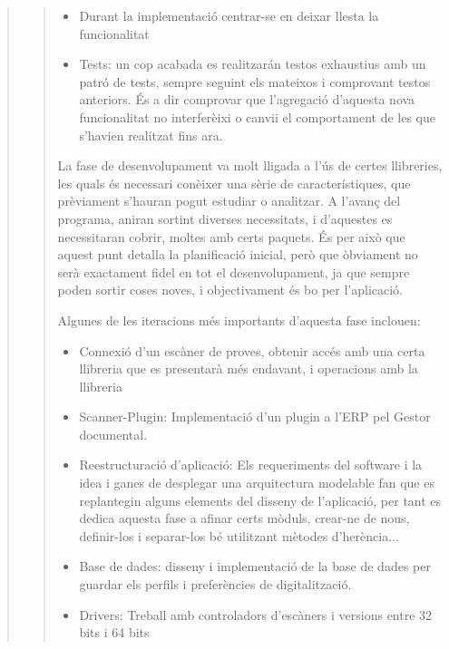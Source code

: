 \documentclass[letterpaper,11pt,catalan]{sphinxmanual}
\begin{document}
\begin{quote}
\begin{quote}
\begin{itemize}
\begin{itemize}
\end{itemize}

\item {} 
Durant la implementació centrar-se en deixar llesta la funcionalitat

\item {} 
Tests: un cop \sphinxquotedblleft{}acabada\sphinxquotedblright{} es realitzarán testos exhaustius amb un patró
de tests, sempre seguint els mateixos i comprovant testos anteriors. És a dir
comprovar que l'agregació d'aquesta nova funcionalitat no interferèixi o canvii
el comportament de les que s'havien realitzat fins ara.

\end{itemize}

La fase de desenvolupament va molt lligada a l'ús de certes llibreries, les quals
és necessari conèixer una sèrie de característiques, que prèviament s'hauran pogut
estudiar o analitzar. A l'avanç del programa, aniran sortint diverses necessitats, i
d'aquestes es necessitaran cobrir, moltes amb certs paquets. És per això que aquest
punt detalla la planificació inicial, però que òbviament no serà exactament fidel
en tot el desenvolupament, ja que sempre poden sortir coses noves, i objectivament
és bo per l'aplicació.

Algunes de les iteracions més importants d'aquesta fase inclouen:
\begin{itemize}
\item {} 
Connexió d'un escàner de proves, obtenir accés amb una certa llibreria que es presentarà
més endavant, i operacions amb la llibreria

\item {} 
Scanner-Plugin: Implementació d'un plugin a l'ERP pel Gestor documental.

\item {} 
Reestructuració d'aplicació: Els requeriments del software i la idea i ganes de desplegar
una arquitectura modelable fan que es replantegin alguns elements del disseny de l'aplicació,
per tant es dedica aquesta fase a afinar certs mòduls, crear-ne de nous, definir-los i separar-los
bé utilitzant mètodes d'herència...

\item {} 
Base de dades: disseny i implementació de la base de dades per guardar els perfils i
preferències de digitalització.

\item {} 
Drivers: Treball amb controladors d'escàners i versions entre 32 bits i 64 bits


\end{itemize}
\end{quote}
\end{quote}
\end{document}
